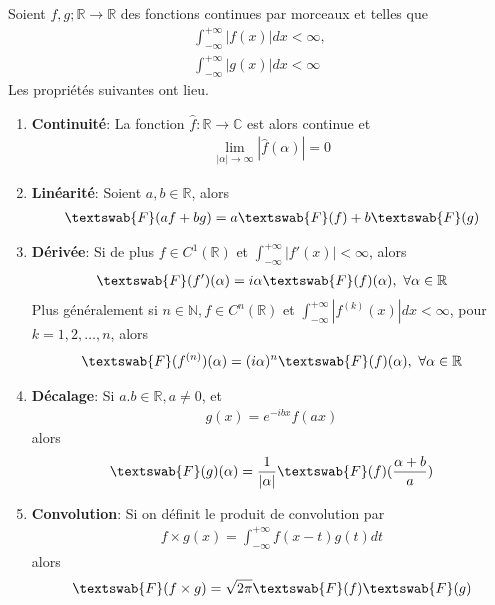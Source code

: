 \begin{myTheorem}
	Soient $f,g;\mathbb{R}\rightarrow\mathbb{R}$ des fonctions continues par morceaux et telles que
	\begin{eqnarray*}
		\int_{-\infty}^{+\infty}|f(x)|dx<\infty,
		\\
		\int_{-\infty}^{+\infty}|g(x)|dx<\infty
	\end{eqnarray*}
	Les propriétés suivantes ont lieu.
	\begin{enumerate}
		\item \textbf{Continuité}: La fonction $\hat{f}:\mathbb{R}\rightarrow\mathbb{C}$ est alors continue et
		\begin{eqnarray}
			\lim_{|\alpha|\to\infty}|\hat{f}(\alpha)|=0
		\end{eqnarray}
		
		\item\textbf{Linéarité}: Soient $a,b\in\mathbb{R}$, alors
		\begin{eqnarray}
			\textswab{F}(af+bg)=a\textswab{F}(f)+b\textswab{F}(g)
		\end{eqnarray}
		
		\item\textbf{Dérivée}: Si de plus $f\in C^1(\mathbb{R})$ et $\int_{-\infty}^{+\infty}|f'(x)|<\infty$, alors
		\begin{eqnarray}
			\textswab{F}(f')(\alpha)=i\alpha \textswab{F}(f)(\alpha), \,\,\forall\alpha\in\mathbb{R}
		\end{eqnarray}
		Plus généralement si $n\in\mathbb{N},f\in C^n(\mathbb{R})$ et $\int_{-\infty}^{+\infty}|f^{(k)}(x)|dx<\infty$, pour $k=1,2,\dots,n$, alors
		\begin{eqnarray}
			\textswab{F}(f^{(n)})(\alpha)=(i\alpha)^n\textswab{F}(f)(\alpha),\,\,\forall\alpha\in\mathbb{R}
		\end{eqnarray}
		
		\item \textbf{Décalage}: Si $a.b\in\mathbb{R}, a\neq 0$, et
		\begin{eqnarray*}
			g(x)=e^{-ibx}f(ax)
		\end{eqnarray*}
		alors
		\begin{eqnarray}
			\textswab{F}(g)(\alpha)=\frac{1}{|\alpha|}\textswab{F}(f)(\frac{\alpha +b}{a})
		\end{eqnarray}
		
		\item\textbf{Convolution}: Si on définit le produit de convolution par
		\begin{eqnarray*}
			f\times g(x)=\int_{-\infty}^{+\infty}f(x-t)g(t)dt
		\end{eqnarray*}
		alors
		\begin{eqnarray}
			\textswab{F}(f\times g)=\sqrt{2\pi}\textswab{F}(f)\textswab{F}(g)
		\end{eqnarray}
		

\end{enumerate}
\end{myTheorem}
